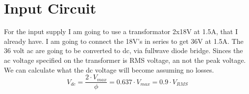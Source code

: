 \section{Input Circuit}
For the input supply I am going to use a transformator 2x18V at 1.5A, that I already have. I am going to connect the 18V's in series to get 36V at 1.5A.
The 36 volt ac are going to be converted to dc, via fullwave diode bridge. Sinces the ac voltage specified on the transformer is RMS voltage, an not the peak voltage. We can calculate what the dc voltage will become assuming no losses.
\begin{equation}
V_{dc} = \frac{ 2 \cdot V_{ max } }{ \phi } = 0.637 \cdot V_{ max } = 0.9 \cdot V_{ RMS }
\end{equation}
